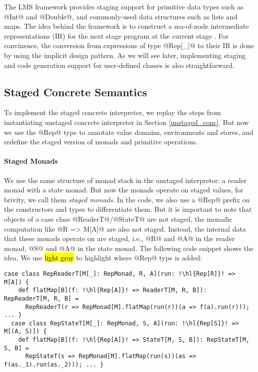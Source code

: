 The LMS framework provides staging support for primitive data types such as
@Int@ and @Double@, and commonly-used data structures such as lists and maps.
The idea behind the framework is to construct a sea-of-node intermediate
representations (IR) for the next stage program at the current stage
\cite{DBLP:conf/birthday/Rompf16}. For convinence, the conversion from
expressions of type @Rep[_]@ to their IR is done by using the implicit design
pattern. As we will see later, implementing staging and code generation
support for user-defined classes is also straightforward.

\subsection{Staged Concrete Semantics}

To implement the staged concrete interpreter, we replay the steps from
instantiating unstaged concrete interpreter in Section \ref{unstaged_conc}.
But now we use the @Rep@ type to annotate value domains, environments and
stores, and redefine the staged version of monads and primitive operations.

\paragraph{Staged Monads}
We use the same structure of monad stack in the unstaged interpreter: a reader
monad with a state monad. But now the monads operate on staged values, for
brivity, we call them \textit{staged monads}. In the code, we also use a @Rep@
prefix on the constructors and types to differentiate them. But it is important
to note that objects of a case class @ReaderT@/@StateT@ are not staged, the
monadic computation like @R => M[A]@ are also not staged. Instead, the internal
data that these monads operate on are staged, i.e., @R@ and @A@ in the
reader monad, @S@ and @A@ in the state monad. The following code
snippet shows the idea. We use \hl{light gray} to highlight where @Rep@ type is added:
\begin{lstlisting}[escapechar=!]
  case class RepReaderT[M[_]: RepMonad, R, A](run: !\hl{Rep[R]}! => M[A]) {
    def flatMap[B](f: !\hl{Rep[A]}! => ReaderT[M, R, B]): RepReaderT[M, R, B] =
      RepReaderT(r => RepMonad[M].flatMap(run(r))(a => f(a).run(r))); ... }
  case class RepStateT[M[_]: RepMonad, S, A](run: !\hl{Rep[S]}! => M[(A, S)]) {
    def flatMap[B](f: !\hl{Rep[A]}! => StateT[M, S, B]): RepStateT[M, S, B] =
      RepStateT(s => RepMonad[M].flatMap(run(s))(as => f(as._1).run(as._2))); ... }
\end{lstlisting}

